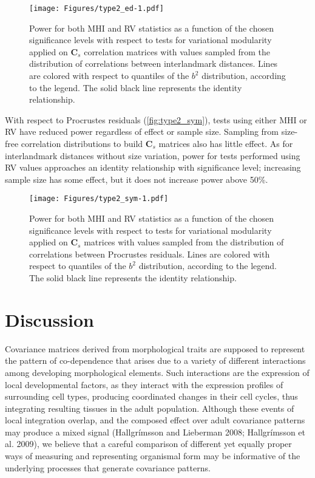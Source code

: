 \documentclass[12pt,]{article}
\begin{document}
\begin{figure}[htbp]
\centering
\texttt{[image: Figures/type2\_ed-1.pdf]}
\caption{Power for both MHI and RV statistics as a function of the
chosen significance levels with respect to tests for variational
modularity applied on $\mathbf{C}_s$ correlation matrices with values
sampled from the distribution of correlations between interlandmark
distances. Lines are colored with respect to quantiles of the $b^2$
distribution, according to the legend. The solid black line represents
the identity relationship. \label{fig:type2_ed}}
\end{figure}

With respect to Procrustes residuals (\autoref{fig:type2_sym}), tests
using either MHI or RV have reduced power regardless of effect or sample
size. Sampling from size-free correlation distributions to build
$\mathbf{C}_s$ matrices also has little effect. As for interlandmark
distances without size variation, power for tests performed using RV
values approaches an identity relationship with significance level;
increasing sample size has some effect, but it does not increase power
above 50\%.

\begin{figure}[htbp]
\centering
\texttt{[image: Figures/type2\_sym-1.pdf]}
\caption{Power for both MHI and RV statistics as a function of the
chosen significance levels with respect to tests for variational
modularity applied on $\mathbf{C}_s$ matrices with values sampled from
the distribution of correlations between Procrustes residuals. Lines are
colored with respect to quantiles of the $b^2$ distribution, according
to the legend. The solid black line represents the identity
relationship. \label{fig:type2_sym}}
\end{figure}

\section{Discussion}\label{discussion}

Covariance matrices derived from morphological traits are supposed to
represent the pattern of co-dependence that arises due to a variety of
different interactions among developing morphological elements. Such
interactions are the expression of local developmental factors, as they
interact with the expression profiles of surrounding cell types,
producing coordinated changes in their cell cycles, thus integrating
resulting tissues in the adult population. Although these events of
local integration overlap, and the composed effect over adult covariance
patterns may produce a mixed signal (Hallgrímsson and Lieberman 2008;
Hallgrímsson et al. 2009), we believe that a careful comparison of
different yet equally proper ways of measuring and representing
organismal form may be informative of the underlying processes that
generate covariance patterns.
\end{document}
